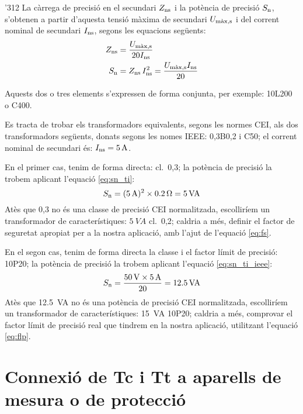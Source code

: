 \begin{dingautolist}{'312}
    La càrrega de precisió en el secundari
    $Z_\mathrm{ns}$ i la potència de precisió $S_\mathrm{n}$, s'obtenen a partir d'aquesta
    tensió màxima de secundari $U_\mathrm{m\grave{a}x,s}$
    i del corrent     nominal de secundari $I_\mathrm{ns}$, segons les equacions següents:
    \begin{align}
        Z_\mathrm{ns} &= \frac{U_\mathrm{m\grave{a}x,s}}{20 I_\mathrm{ns}}\\
        S_\mathrm{n} &= Z_\mathrm{ns} \,I_\mathrm{ns}^2 = \frac{U_\mathrm{m\grave{a}x,s} I_\mathrm{ns}}{20}
        \label{eq:sn_ti_ieee}
    \end{align}
\end{dingautolist}

Aquests dos o tres elements s'expressen de forma conjunta, per exemple:
10L200 o C400.


\begin{exemple}
    Es tracta de trobar els transformadors equivalents, segons les normes CEI, als dos
    transformadors següents, donats segons les nomes IEEE: 0,3B0,2 i
    C50; el corrent nominal de secundari és:    $I_\mathrm{ns}=\SI{5}{A}$.

    En el primer cas, tenim de forma directa: cl.~0,3; la potència de precisió la trobem
    aplicant l'equació \eqref{eq:sn_ti}:
    \[
        S_\mathrm{n} =(\SI{5}{A})^2 \times \SI{0,2}{\ohm} =  \SI{5}{VA}
    \]
    Atès que 0,3 no és una classe de precisió CEI normalitzada,
    escolliríem un transformador de característiques: $\SI{5}{VA}$ cl.~0,2; caldria a més, definir el factor de
    seguretat apropiat per a la nostra aplicació, amb l'ajut de l'equació \eqref{eq:fs}.

    En el segon cas, tenim de forma directa la classe i el factor límit de
    precisió: 10P20; la potència de precisió la trobem
    aplicant l'equació \eqref{eq:sn_ti_ieee}:
    \[
        S_\mathrm{n} = \frac{\SI{50}{V} \times\SI{5}{A}}{20} = \SI{12,5}{VA}
    \]
    Atès que \SI{12,5}{VA} no és una potència de precisió CEI normalitzada,
     escolliríem un transformador de característiques:
    \SI{15}{VA} 10P20; caldria a més, comprovar el factor límit de precisió real
    que tindrem en la nostra aplicació, utilitzant l'equació \eqref{eq:flp}.
\end{exemple}

\section{Connexió de Tc i Tt a aparells de mesura o de
protecció}\label{sec:conex_ti_tt}

